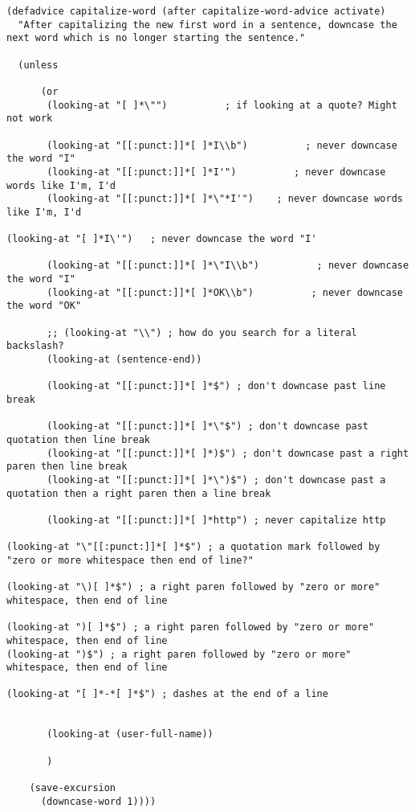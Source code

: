 \documentclass[11pt]{article}
\begin{document}
\label{sec:org6ee8be2}
\begin{verbatim}
(defadvice capitalize-word (after capitalize-word-advice activate)
  "After capitalizing the new first word in a sentence, downcase the next word which is no longer starting the sentence."

  (unless

      (or
       (looking-at "[ ]*\"")          ; if looking at a quote? Might not work

       (looking-at "[[:punct:]]*[ ]*I\\b")          ; never downcase the word "I"
       (looking-at "[[:punct:]]*[ ]*I'")          ; never downcase words like I'm, I'd
       (looking-at "[[:punct:]]*[ ]*\"*I'")    ; never downcase words like I'm, I'd 

(looking-at "[ ]*I\'")   ; never downcase the word "I'

       (looking-at "[[:punct:]]*[ ]*\"I\\b")          ; never downcase the word "I"
       (looking-at "[[:punct:]]*[ ]*OK\\b")          ; never downcase the word "OK"

       ;; (looking-at "\\") ; how do you search for a literal backslash?
       (looking-at (sentence-end))

       (looking-at "[[:punct:]]*[ ]*$") ; don't downcase past line break 

       (looking-at "[[:punct:]]*[ ]*\"$") ; don't downcase past quotation then line break 
       (looking-at "[[:punct:]]*[ ]*)$") ; don't downcase past a right paren then line break 
       (looking-at "[[:punct:]]*[ ]*\")$") ; don't downcase past a quotation then a right paren then a line break 

       (looking-at "[[:punct:]]*[ ]*http") ; never capitalize http 

(looking-at "\"[[:punct:]]*[ ]*$") ; a quotation mark followed by "zero or more whitespace then end of line?"

(looking-at "\)[ ]*$") ; a right paren followed by "zero or more" whitespace, then end of line 

(looking-at ")[ ]*$") ; a right paren followed by "zero or more" whitespace, then end of line 
(looking-at ")$") ; a right paren followed by "zero or more" whitespace, then end of line 

(looking-at "[ ]*-*[ ]*$") ; dashes at the end of a line 


       (looking-at (user-full-name))

       )

    (save-excursion
      (downcase-word 1))))
\end{verbatim}
\end{document}

